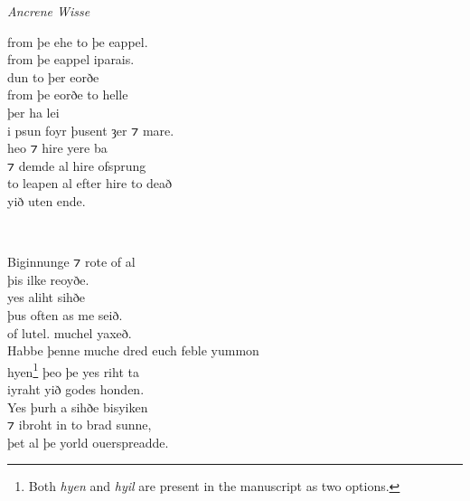 \begin{texts}{\textit{Ancrene Wisse}}
\begin{textglossed}
from þe ehe to þe eappel.\\
from þe eappel iparais.\\
dun to þer eorðe\\
from þe eorðe to helle\\
þer ha lei\\
i psun foyr þusent ȝer ⁊ mare.\\
heo ⁊ hire yere ba \\
⁊ demde al hire ofsprung\\
to leapen al efter hire to deað\\
yið uten ende.%

~

Biginnunge ⁊ rote of al\\
þis ilke reoyðe.\\
yes aliht sihðe\\
þus often as me seið.\\
of lutel. muchel yaxeð.\\
Habbe þenne muche dred euch feble yummon\\
hyen\footnote{Both \textit{hyen} and \textit{hyil} are present in the manuscript as two options.} þeo þe yes riht ta\\
iyraht yið godes honden.\\
Yes þurh a sihðe bisyiken\\
⁊ ibroht in to brad sunne,\\
þet al þe yorld ouerspreadde.
\end{textglossed}



\end{texts}

